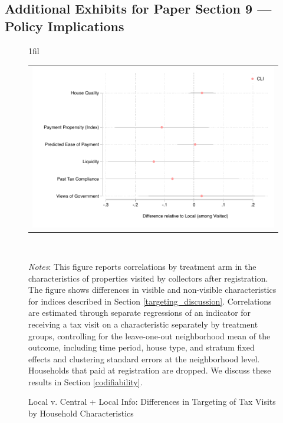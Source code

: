 \documentclass[12pt,english]{article}
\makeatletter
\renewcommand{\footnotesize}{\fontsize{9pt}{11pt}\selectfont}\usepackage[unicode=true,
\newcommand*{\centerfloat}{%
  \parindent \z@
  \leftskip \z@ \@plus 1fil \@minus \textwidth
  \rightskip\leftskip
  \parfillskip \z@skip}
\makeatother
\begin{document}

\clearpage


\clearpage


\subsection{Additional Exhibits for Paper Section 9 --- Policy Implications}


\begin{figure}[H]
\centering{}\caption{Local v. Central + Local Info: Differences in Targeting of Tax Visits by Household Characteristics
\label{main_targeting_appendix_LvCLI}}
\centering
\centerfloat
\begin{tabular}{c}
\includegraphics[scale=.7]{Output/chars_visited_LvCLI.pdf}\\
\end{tabular}
\usebox{\tablebox}\\[1ex]
\parbox{6in}{\footnotesize \textit{Notes}: This figure reports correlations by treatment arm in the characteristics of properties visited by collectors after registration. The figure shows differences in visible and non-visible characteristics for indices described in Section \ref{targeting_discussion}. Correlations are estimated through separate regressions of an indicator for receiving a tax visit on a characteristic separately by treatment groups, controlling for the leave-one-out neighborhood mean of the outcome, including time period, house type, and stratum fixed effects and clustering standard errors at the neighborhood level.  Households that paid at registration are dropped. We discuss these results in Section \ref{codifiability}.}
\end{figure}
\end{document}
